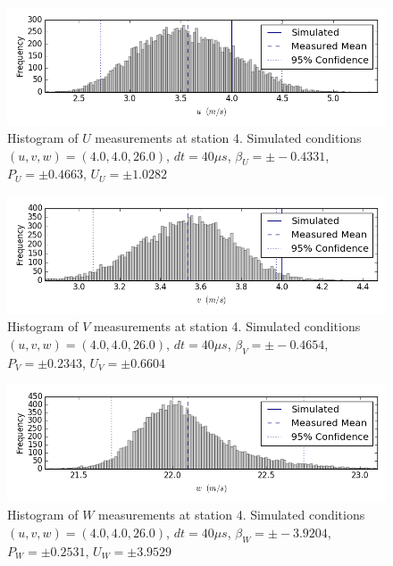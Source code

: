 \begin{figure}[H]
\centering
\includegraphics[width=6in]{figs/Ely_May28th04002/uncertainty_Ely_May28th04002_U}
\caption{Histogram of $U$ measurements at station 4. Simulated conditions $(u,v,w)=(4.0, 4.0, 26.0)$, $dt=40 \mu s$, $\beta_U=\pm -0.4331$, $P_U=\pm 0.4663$, $U_U=\pm 1.0282$}
\label{fig:uncertainty_Ely_May28th04002_U}
\end{figure}


\begin{figure}[H]
\centering
\includegraphics[width=6in]{figs/Ely_May28th04002/uncertainty_Ely_May28th04002_V}
\caption{Histogram of $V$ measurements at station 4. Simulated conditions $(u,v,w)=(4.0, 4.0, 26.0)$, $dt=40 \mu s$, $\beta_V=\pm -0.4654$, $P_V=\pm 0.2343$, $U_V=\pm 0.6604$}
\label{fig:uncertainty_Ely_May28th04002_V}
\end{figure}


\begin{figure}[H]
\centering
\includegraphics[width=6in]{figs/Ely_May28th04002/uncertainty_Ely_May28th04002_W}
\caption{Histogram of $W$ measurements at station 4. Simulated conditions $(u,v,w)=(4.0, 4.0, 26.0)$, $dt=40 \mu s$, $\beta_W=\pm -3.9204$, $P_W=\pm 0.2531$, $U_W=\pm 3.9529$}
\label{fig:uncertainty_Ely_May28th04002_W}
\end{figure}


